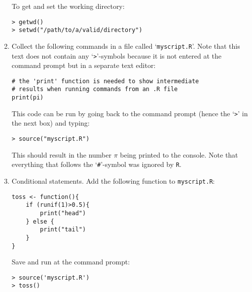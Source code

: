 \documentclass[11pt]{article}
\begin{document}
\begin{enumerate}
To get and set the working directory:
  
\begin{verbatim}
> getwd()
> setwd("/path/to/a/valid/directory")
\end{verbatim}

\item Collect the following commands in a file called
  `\texttt{myscript.R}'.  Note that this text does not contain any
  `\verb|>|'-symbols because it is not entered at the command prompt
  but in a separate text editor:

\begin{verbatim}
# the 'print' function is needed to show intermediate
# results when running commands from an .R file
print(pi)
\end{verbatim}

This code can be run by going back to the command prompt (hence the
`\verb|>|' in the next box) and typing:

\begin{verbatim}
> source("myscript.R")
\end{verbatim}

This should result in the number $\pi$ being printed to the console.
Note that everything that follows the `\verb|#|'-symbol was ignored by
\texttt{R}.

\item Conditional statements. Add the following function to
  \texttt{myscript.R}:

\begin{verbatim}
toss <- function(){
    if (runif(1)>0.5){
        print("head")
    } else {
        print("tail")
    }
}
\end{verbatim}

Save and run at the command prompt:

\begin{verbatim}
> source('myscript.R')
> toss()
\end{verbatim}


\end{enumerate}
\end{document}
